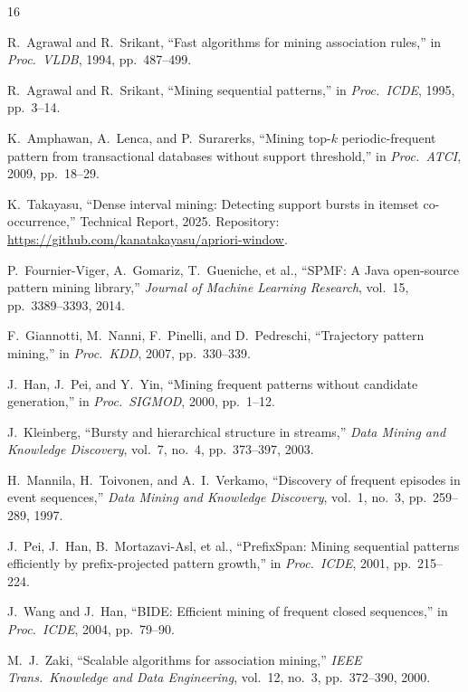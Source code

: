 \documentclass[11pt,a4paper]{article}
\begin{document}
\begin{thebibliography}{16}

R.~Agrawal and R.~Srikant,
``Fast algorithms for mining association rules,''
in \emph{Proc.\ VLDB}, 1994, pp.~487--499.

R.~Agrawal and R.~Srikant,
``Mining sequential patterns,''
in \emph{Proc.\ ICDE}, 1995, pp.~3--14.

K.~Amphawan, A.~Lenca, and P.~Surarerks,
``Mining top-$k$ periodic-frequent pattern from transactional databases without support threshold,''
in \emph{Proc.\ ATCI}, 2009, pp.~18--29.

K.~Takayasu,
``Dense interval mining: Detecting support bursts in itemset co-occurrence,''
Technical Report, 2025.
Repository: \url{https://github.com/kanatakayasu/apriori-window}.

P.~Fournier-Viger, A.~Gomariz, T.~Gueniche, et al.,
``SPMF: A Java open-source pattern mining library,''
\emph{Journal of Machine Learning Research}, vol.~15, pp.~3389--3393, 2014.

F.~Giannotti, M.~Nanni, F.~Pinelli, and D.~Pedreschi,
``Trajectory pattern mining,''
in \emph{Proc.\ KDD}, 2007, pp.~330--339.

J.~Han, J.~Pei, and Y.~Yin,
``Mining frequent patterns without candidate generation,''
in \emph{Proc.\ SIGMOD}, 2000, pp.~1--12.

J.~Kleinberg,
``Bursty and hierarchical structure in streams,''
\emph{Data Mining and Knowledge Discovery}, vol.~7, no.~4, pp.~373--397, 2003.

H.~Mannila, H.~Toivonen, and A.~I.~Verkamo,
``Discovery of frequent episodes in event sequences,''
\emph{Data Mining and Knowledge Discovery}, vol.~1, no.~3, pp.~259--289, 1997.

J.~Pei, J.~Han, B.~Mortazavi-Asl, et al.,
``PrefixSpan: Mining sequential patterns efficiently by prefix-projected pattern growth,''
in \emph{Proc.\ ICDE}, 2001, pp.~215--224.

J.~Wang and J.~Han,
``BIDE: Efficient mining of frequent closed sequences,''
in \emph{Proc.\ ICDE}, 2004, pp.~79--90.

M.~J.~Zaki,
``Scalable algorithms for association mining,''
\emph{IEEE Trans.\ Knowledge and Data Engineering}, vol.~12, no.~3, pp.~372--390, 2000.


\end{thebibliography}
\end{document}
